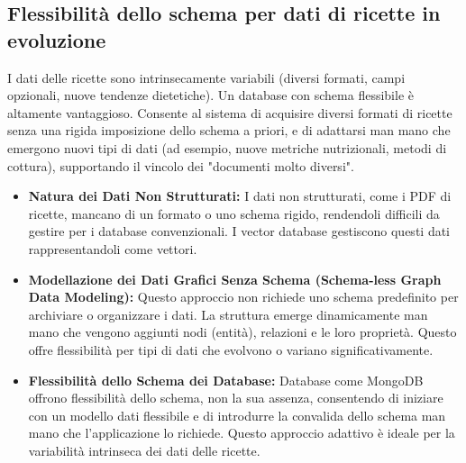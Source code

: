 \documentclass[a4paper, 11pt]{article}
\begin{document}
\subsection{Flessibilità dello schema per dati di ricette in evoluzione}
I dati delle ricette sono intrinsecamente variabili (diversi formati, campi opzionali, nuove tendenze dietetiche). Un database con schema flessibile è altamente vantaggioso. Consente al sistema di acquisire diversi formati di ricette senza una rigida imposizione dello schema a priori, e di adattarsi man mano che emergono nuovi tipi di dati (ad esempio, nuove metriche nutrizionali, metodi di cottura), supportando il vincolo dei "documenti molto diversi".
\begin{itemize}
    \item \textbf{Natura dei Dati Non Strutturati:} I dati non strutturati, come i PDF di ricette, mancano di un formato o uno schema rigido, rendendoli difficili da gestire per i database convenzionali. \cite{qdrant_vector_db} I vector database gestiscono questi dati rappresentandoli come vettori. \cite{qdrant_vector_db}
    \item \textbf{Modellazione dei Dati Grafici Senza Schema (Schema-less Graph Data Modeling):} Questo approccio non richiede uno schema predefinito per archiviare o organizzare i dati. La struttura emerge dinamicamente man mano che vengono aggiunti nodi (entità), relazioni e le loro proprietà. \cite{schemaless_graph_modeling} Questo offre flessibilità per tipi di dati che evolvono o variano significativamente.
    \item \textbf{Flessibilità dello Schema dei Database:} Database come MongoDB offrono flessibilità dello schema, non la sua assenza, consentendo di iniziare con un modello dati flessibile e di introdurre la convalida dello schema man mano che l'applicazione lo richiede. \cite{mongodb_flexible_schema} Questo approccio adattivo è ideale per la variabilità intrinseca dei dati delle ricette.
\end{itemize}
\end{document}
